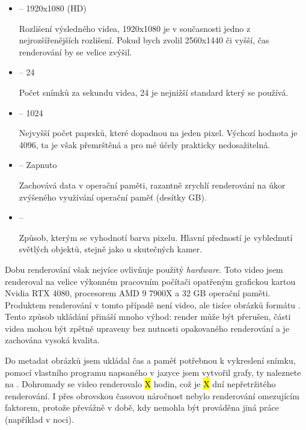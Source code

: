 {\begin{itemize}
    \item { -- 1920x1080 (HD)}\par
        {Rozlišení výsledného videa, 1920x1080 je v současnosti jedno z nejrozšířenějších rozlišení. Pokud bych zvolil 2560x1440 či vyšší, čas renderování by se velice zvýšil.}
    \item { -- 24}\par
        {Počet snímků za sekundu videa, 24 je nejnižší standard který se používá.}
    \item { -- 1024}\par
        {Nejvyšší počet paprsků, které dopadnou na jeden pixel. Výchozí hodnota je 4096, ta je však přemrštěná a pro mé účely prakticky nedosažitelná.}
    \item { -- Zapnuto}\par
        {Zachovává data v operační paměti, razantně zrychlí renderování na úkor zvýšeného využívání operační paměť (desítky GB).}
    \item { -- }\par
        {Způsob, kterým se vyhodnotí barva pixelu. Hlavní předností  je vyblednutí světlých objektů, stejně jako u skutečných kamer.}
\end{itemize}

{Dobu renderování však nejvíce ovlivňuje použitý \textit{hardware}. Toto video jsem renderoval na velice výkonném pracovním počítači opatřeným grafickou kartou Nvidia RTX 4080, procesorem AMD 9 7900X a 32 GB operační paměti.}\odst
{Produktem renderování v tomto případě není video, ale tisíce obrázků formátu . Tento způsob ukládání přináší mnoho výhod: render může být přerušen, části videa mohou být zpětně upraveny bez nutnosti opakovaného renderování a je zachována vysoká kvalita.}

\newpage

{Do metadat obrázků jsem ukládal čas a paměť potřebnou k vykreslení snímku, pomocí vlastního programu napsaného v jazyce  jsem vytvořil grafy, ty naleznete na . Dohromady se video renderovalo \hl{X} hodin, což je \hl{X} dní nepřetržitého renderování. I přes obrovskou časovou náročnost nebylo renderování omezujícím faktorem, protože převážně v době, kdy nemohla být prováděna jiná práce (například v noci).}

}
